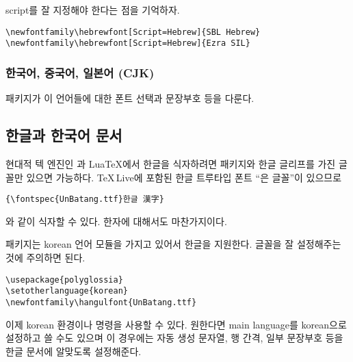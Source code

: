 script를 잘 지정해야 한다는 점을 기억하자.

\begin{lscommand}
\verb|\newfontfamily\hebrewfont[Script=Hebrew]{SBL Hebrew}| \\
\verb|\newfontfamily\hebrewfont[Script=Hebrew]{Ezra SIL}|
\end{lscommand}


\subsubsection{한국어, 중국어, 일본어 (CJK)}

\cite{xecjk} 패키지가 이 언어들에 대한 폰트 선택과 문장부호 등을 다룬다.


\subsection{한글과 한국어 문서}
현대적 텍 엔진인 \XeTeX 과 Lua\TeX 에서 한글을 식자하려면  패키지와 한글 글리프를 가진 글꼴만 
있으면 가능하다. \TeX\,Live에 포함된 한글 트루타입 폰트 ``은 글꼴''이 있으므로 
\begin{verbatim}
{\fontspec{UnBatang.ttf}한글 漢字}
\end{verbatim}
와 같이 식자할 수 있다. 한자에 대해서도 마찬가지이다.

\medskip 

 패키지는 korean 언어 모듈을 가지고 있어서 한글을 지원한다.
글꼴을 잘 설정해주는 것에 주의하면 된다.
\begin{verbatim}
\usepackage{polyglossia}
\setotherlanguage{korean}
\newfontfamily\hangulfont{UnBatang.ttf}
\end{verbatim}
이제 korean 환경이나  명령을 사용할 수 있다. 원한다면 main language를 korean으로 설정하고 쓸 수도
있으며 이 경우에는 자동 생성 문자열, 행 간격, 일부 문장부호 등을 한글 문서에 알맞도록 설정해준다.

